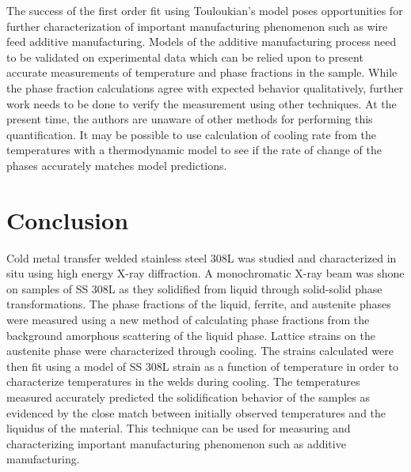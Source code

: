 \documentclass[twocolumn,nofootinbib,notitlepage,aps]{revtex4-1}
\begin{document}
The success of the first order fit using Touloukian's model poses opportunities for further characterization of important manufacturing phenomenon such as wire feed additive manufacturing. Models of the additive manufacturing process need to be validated on experimental data which can be relied upon to present accurate measurements of temperature and phase fractions in the sample. While the phase fraction calculations agree with expected behavior qualitatively, further work needs to be done to verify the measurement using other techniques. At the present time, the authors are unaware of other methods for performing this quantification. It may be possible to use calculation of cooling rate from the temperatures with a thermodynamic model to see if the rate of change of the phases accurately matches model predictions.

\section{Conclusion}
Cold metal transfer welded stainless steel 308L was studied and characterized in situ using high energy X-ray diffraction. A monochromatic X-ray beam was shone on samples of SS 308L as they solidified from liquid through solid-solid phase transformations. The phase fractions of the liquid, ferrite, and austenite phases were measured using a new method of calculating phase fractions from the background amorphous scattering of the liquid phase. Lattice strains on the austenite phase were characterized through cooling. The strains calculated were then fit using a model of SS 308L strain as a function of temperature in order to characterize temperatures in the welds during cooling. The temperatures measured accurately predicted the solidification behavior of the samples as evidenced by the close match between initially observed temperatures and the liquidus of the material. This technique can be used for measuring and characterizing important manufacturing phenomenon such as additive manufacturing.


\end{document}
